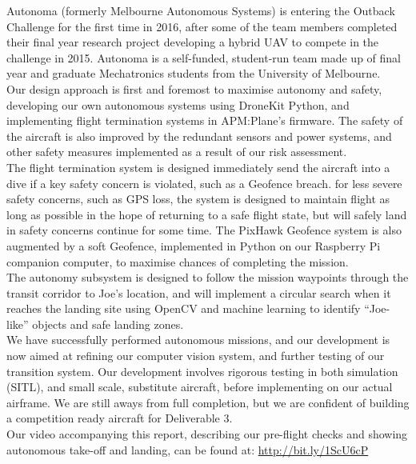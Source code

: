 Autonoma (formerly Melbourne Autonomous Systems) is entering the Outback Challenge for the first time in 2016, after some of the team members completed their final year research project developing a hybrid UAV to compete in the challenge in 2015. Autonoma is a self-funded, student-run team made up of final year and graduate Mechatronics students from the University of Melbourne.\\

Our design approach is first and foremost to maximise autonomy and safety, developing our own autonomous systems using DroneKit Python, and implementing flight termination systems in APM:Plane's firmware. The safety of the aircraft is also improved by the redundant sensors and power systems, and other safety measures implemented as a result of our risk assessment.\\

The flight termination system is designed immediately send the aircraft into a dive if a key safety concern is violated, such as a Geofence breach. for less severe safety concerns, such as GPS loss, the system is designed to maintain flight as long as possible in the hope of returning to a safe flight state, but will safely land in safety concerns continue for some time. The PixHawk Geofence system is also augmented by a soft Geofence, implemented in Python on our Raspberry Pi companion computer, to maximise chances of completing the mission.\\

The autonomy subsystem is designed to follow the mission waypoints through the transit corridor to Joe's location, and will implement a circular search when it reaches the landing site using OpenCV and machine learning to identify ``Joe-like'' objects and safe landing zones.\\

We have successfully performed autonomous missions, and our development is now aimed at refining our computer vision system, and further testing of our transition system. Our development involves rigorous testing in both simulation (SITL), and small scale, substitute aircraft, before implementing on our actual airframe. We are still aways from full completion, but we are confident of building a competition ready aircraft for Deliverable 3.\\

Our video accompanying this report, describing our pre-flight checks and showing autonomous take-off and landing, can be found at: \url{http://bit.ly/1ScU6cP}